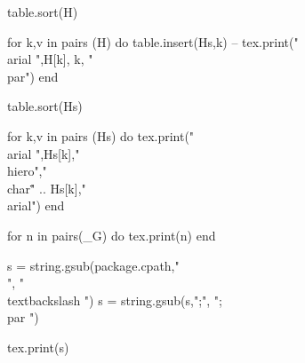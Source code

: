 \documentclass{article}
\begin{document}
\begin{luacode*}
table.sort(H)

for k,v in pairs (H) do
   table.insert(Hs,k)
   -- tex.print("\\arial ",H[k], k, "\\par")
end

table.sort(Hs)

for k,v in pairs (Hs) do
    tex.print("\\arial ",Hs[k],"\\hiero","\\char\"" .. Hs[k],"\\arial")
end

for n in pairs(_G) do tex.print(n) end


s = string.gsub(package.cpath,"\\", "\\textbackslash ")
s = string.gsub(s,";", ";\\par ")

tex.print(s)
\end{luacode*}
\end{document}
